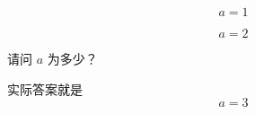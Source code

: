 
\begin{equation}
a = 1
\end{equation}

\begin{equation}
a = 2
\end{equation}



\begin{example}{}
请问 $a$ 为多少？

\pay 实际答案就是
\begin{equation}
a = 3
\end{equation}
\paid
\end{example}
